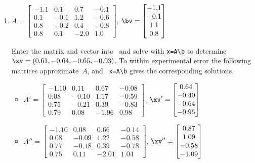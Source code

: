 \begin{example}
\begin{enumerate}
\item \(A=\begin{bmatrix} -1.1&0.1&0.7&-0.1
\\0.1&-0.1&1.2&-0.6
\\0.8&-0.2&0.4&-0.8
\\0.8&0.1&-2.0&1.0 \end{bmatrix}\),
\(\bv=\begin{bmatrix} -1.1
\\-0.1
\\1.1
\\0.8
 \end{bmatrix}\)
\begin{solution} 
Enter the matrix and vector into \script\ and solve with \verb|x=A\b| to determine \(\xv=(0.61,-0.64,-0.65,-0.93)\).
\setbox\ajrqrbox\hbox{}%
\marginpar{\usebox{\ajrqrbox\\[2ex]}}%
To within experimental error the following matrices approximate~\(A\), and \script\ \verb|x=A\b| gives the corresponding solutions.
\begin{itemize}\small
\item \(A'=\begin{bmatrix} -1.10&0.11&0.67&-0.08
\\0.08&-0.10&1.17&-0.59
\\0.75&-0.21&0.39&-0.83
\\0.79&0.08&-1.96&0.98 \end{bmatrix}\),
\(\xv'=\begin{bmatrix} 0.64
\\-0.40
\\-0.64
\\-0.95 \end{bmatrix}\)
\item \(A''=\begin{bmatrix} -1.10&0.08&0.66&-0.14
\\0.08&-0.09&1.22&-0.58
\\0.77&-0.18&0.39&-0.78
\\0.75&0.11&-2.01&1.04 \end{bmatrix}\),
\(\xv''=\begin{bmatrix} 0.87
\\1.09
\\-0.58
\\-1.09 \end{bmatrix}\)

\end{itemize}
\end{solution}
\end{enumerate}
\end{example}
